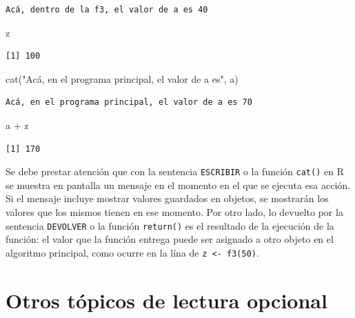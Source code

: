 \documentclass[
]{book}
\newenvironment{Shaded}{\begin{snugshade}}{\end{snugshade}}
\newcommand{\FunctionTok}[1]{\textcolor[rgb]{0.00,0.00,0.00}{#1}}
\newcommand{\NormalTok}[1]{#1}
\newcommand{\SpecialCharTok}[1]{\textcolor[rgb]{0.00,0.00,0.00}{#1}}
\newcommand{\StringTok}[1]{\textcolor[rgb]{0.31,0.60,0.02}{#1}}
\begin{document}
\begin{verbatim}
Acá, dentro de la f3, el valor de a es 40
\end{verbatim}

\begin{Shaded}
\begin{Highlighting}[]
\NormalTok{z}
\end{Highlighting}
\end{Shaded}

\begin{verbatim}
[1] 100
\end{verbatim}

\begin{Shaded}
\begin{Highlighting}[]
\FunctionTok{cat}\NormalTok{(}\StringTok{"Acá, en el programa principal, el valor de a es"}\NormalTok{, a)}
\end{Highlighting}
\end{Shaded}

\begin{verbatim}
Acá, en el programa principal, el valor de a es 70
\end{verbatim}

\begin{Shaded}
\begin{Highlighting}[]
\NormalTok{a }\SpecialCharTok{+}\NormalTok{ z}
\end{Highlighting}
\end{Shaded}

\begin{verbatim}
[1] 170
\end{verbatim}

Se debe prestar atención que con la sentencia \texttt{ESCRIBIR} o la función \texttt{cat()} en R se muestra en pantalla un mensaje en el momento en el que se ejecuta esa acción. Si el mensaje incluye mostrar valores guardados en objetos, se mostrarán los valores que los mismos tienen en ese momento. Por otro lado, lo devuelto por la sentencia \texttt{DEVOLVER} o la función \texttt{return()} es el resultado de la ejecución de la función: el valor que la función entrega puede ser asignado a otro objeto en el algoritmo principal, como ocurre en la lína de \texttt{z\ \textless{}-\ f3(50)}.

\hypertarget{otros-tuxf3picos-de-lectura-opcional}{%
\section{Otros tópicos de lectura opcional}\label{otros-tuxf3picos-de-lectura-opcional}}
\end{document}
